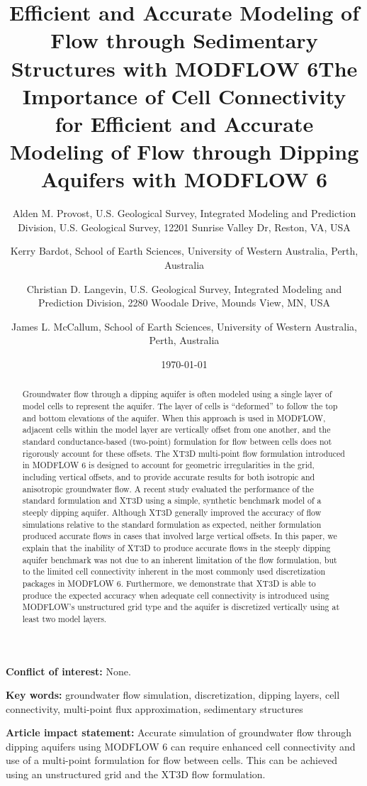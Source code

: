 \documentclass{article}
\title{Efficient and Accurate Modeling of Flow through Sedimentary Structures with MODFLOW 6}
\title{The Importance of Cell Connectivity for Efficient and Accurate Modeling of Flow through Dipping Aquifers with MODFLOW 6}
\author{
	Alden M. Provost, U.S. Geological Survey, Integrated Modeling and Prediction Division, U.S. Geological Survey, 12201 Sunrise Valley Dr, Reston, VA, USA  \\
	\and 
	Kerry Bardot, School of Earth Sciences, University of Western Australia, Perth, Australia \\
	\and 
	Christian D. Langevin, U.S. Geological Survey, Integrated Modeling and Prediction Division, 2280 Woodale Drive, Mounds View, MN, USA \\
	\and 
	James L. McCallum, School of Earth Sciences, University of Western Australia, Perth, Australia \\
	}
\date{\today}
\begin{document}
\maketitle

\textbf{Conflict of interest:} None.

\textbf{Key words:} groundwater flow simulation, discretization, dipping layers, cell connectivity, multi-point flux approximation, sedimentary structures


\textbf{Article impact statement:} Accurate simulation of groundwater flow through dipping aquifers using MODFLOW 6 can require enhanced cell connectivity and use of a multi-point formulation for flow between cells. This can be achieved using an unstructured grid and the XT3D flow formulation.

\begin{abstract}

Groundwater flow through a dipping aquifer is often modeled using a single layer of model cells to represent the aquifer. The layer of cells is ``deformed'' to follow the top and bottom elevations of the aquifer. When this approach is used in MODFLOW, adjacent cells within the model layer are vertically offset from one another, and the standard conductance-based (two-point) formulation for flow between cells does not rigorously account for these offsets. The XT3D multi-point flow formulation introduced in MODFLOW 6 is designed to account for geometric irregularities in the grid, including vertical offsets, and to provide accurate results for both isotropic and anisotropic groundwater flow.  A recent study evaluated the performance of the standard formulation and XT3D using a simple, synthetic benchmark model of a steeply dipping aquifer. Although XT3D generally improved the accuracy of flow simulations relative to the standard formulation as expected, neither formulation produced accurate flows in cases that involved large vertical offsets. In this paper, we explain that the inability of XT3D to produce accurate flows in the steeply dipping aquifer benchmark was not due to an inherent limitation of the flow formulation, but to the limited cell connectivity inherent in the most commonly used discretization packages in MODFLOW 6. Furthermore, we demonstrate that XT3D is able to produce the expected accuracy when adequate cell connectivity is introduced using MODFLOW's unstructured grid type and the aquifer is discretized vertically using at least two model layers.

\end{abstract}
\end{document}
